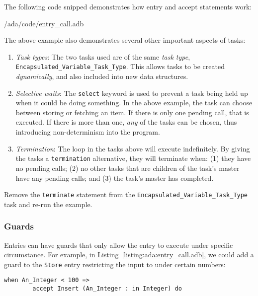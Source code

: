 The following code snipped demonstrates how entry and accept statements work:

 {\rootdir/ada/code/entry_call.adb}

The above example also demonstrates several other important aspects of tasks:

\begin{enumerate}

 \item \emph{Task types}: The two tasks used are of the same \emph{task type}, \texttt{Encapsulated\_Variable\_Task\_Type}. This allows tasks to be created \emph{dynamically}, and also included into new data structures.

 \item \emph{Selective waits}: The \texttt{select} keyword is used to prevent a task being held up when it could be doing something. In the above example, the task can choose between storing or fetching an item. If there is only one pending call, that is executed. If there is more than one, \emph{any} of the tasks can be chosen, thus introducing non-determinism into the program.

 \item \emph{Termination}: The loop in the tasks above will execute indefinitely. By giving the tasks a \texttt{termination} alternative, they will terminate when: (1) they have no pending calls; (2) no other tasks that are children of the task's master have any pending calls; and (3) the task's master has completed.

\end{enumerate}

\begin{exercise}
Remove the \texttt{terminate} statement from the \texttt{Encapsulated\_Variable\_Task\_Type} task and re-run the example.
\end{exercise}

\subsubsection*{Guards}

Entries can have guards that only allow the entry to execute under specific circumstance. For example, in Listing~\ref{listing:ada:entry_call.adb}, we could add a guard to the \texttt{Store} entry restricting the input to under certain numbers:

\begin{lstlisting}[caption={~}]
     when An_Integer < 100 =>
        accept Insert (An_Integer : in Integer) do
\end{lstlisting}

